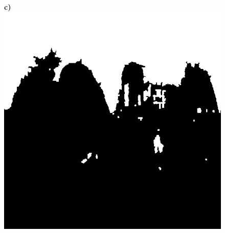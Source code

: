 \documentclass{article}
\begin{document}
\begin{figure}
\textbf{\scriptsize{c)}}\includegraphics[scale=0.27]{Images/2/FloodfillOutput.png}
\end{figure} 

\clearpage
\end{document}
